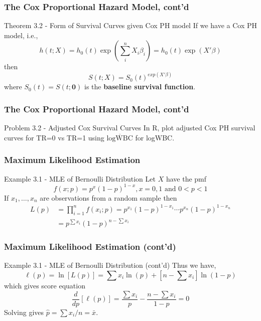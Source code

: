 \documentclass{beamer}
\theoremstyle{definition}
\begin{document}
\begin{frame}
\frametitle{The Cox Proportional Hazard Model, cont'd}
\begin{block}{Theorem 3.2 - Form of Survival Curves given Cox PH model}
If we have a Cox PH model, i.e.,
\[
h(t;X) = h_0(t)\exp\left(\sum_i^n X_i \beta_i\right)= h_0(t) \exp(X' \beta)
\]
then
\[
S(t;X) = S_0(t)^{exp(X'\beta)}
\]
where $S_0(t) = S(t;\mathbf{0})$ is the \textbf{baseline survival function}.
\end{block}
\end{frame}


\begin{frame}
\frametitle{The Cox Proportional Hazard Model, cont'd}
\begin{block}{Problem 3.2 - Adjusted Cox Survival Curves}
In R, plot adjusted Cox PH survival curves for TR=0 vs TR=1 using $\overline{\text{logWBC}}$ for logWBC.
\end{block}
\end{frame}

\begin{frame}
\frametitle{Maximum Likelihood Estimation}
\begin{block}{Example 3.1 - MLE of Bernoulli Distribution}
Let $X$ have the pmf
\[
f(x;p) =   p^x (1-p)^{1-x}, x=0,1 \text{ and } 0<p<1
\]
If $x_1,\ldots,x_n$ are observations from a random sample then
\begin{align*}
L(p) & =  \prod_{i=1}^n f(x_i;p) = p^{x_1}(1-p)^{1-x_1} \cdots p^{x_n}(1-p)^{1-x_n} \\
& = p^{\sum x_i} (1-p)^{n-\sum x_i}
\end{align*}
\end{block}
\end{frame}


\begin{frame}
\frametitle{Maximum Likelihood Estimation (cont'd)}
\begin{block}{Example 3.1 - MLE of Bernoulli Distribution (cont'd)}
Thus we have,
\[
\ell(p) = \ln[L(p)] = \sum x_i \ln(p) +[n-\sum x_i] \ln(1-p)
\]
which gives score equation
\[
\frac{d}{dp}[\ell(p)]= \frac{\sum x_i}{p} - \frac{n-\sum x_i}{1-p} = 0
\]
Solving gives $\hat{p} = \sum x_i/n = \bar{x}$.
\end{block}
\end{frame}
\end{document}
